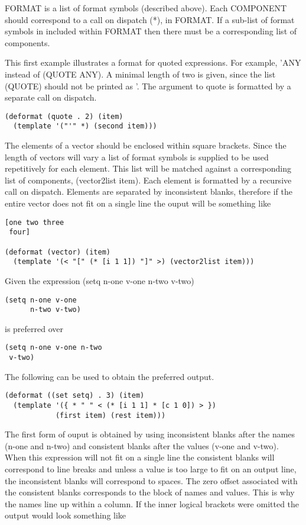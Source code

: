 {    FORMAT  is a list of format symbols (described above).  Each
    COMPONENT should correspond to a call on  dispatch  (*),  in
    FORMAT.   If a sub-list of format symbols in included within
    FORMAT  then  there  must  be  a   corresponding   list   of
    components.
}

  This   first   example   illustrates   a   format  for  quoted
expressions.  For example, 'ANY  instead  of  (QUOTE  ANY).    A
minimal  length  of  two is given, since the list (QUOTE) should
not be printed as '.  The argument to quote is  formatted  by  a
separate call on dispatch.

\begin{verbatim}
(deformat (quote . 2) (item)
  (template '("'" *) (second item)))
\end{verbatim}
  The  elements  of  a  vector  should be enclosed within square
brackets.  Since the length of  vectors  will  vary  a  list  of
format  symbols  is  supplied  to  be used repetitively for each
element.  This list will be matched against a corresponding list
of components, (vector2list item).  Each element is formatted by
a  recursive  call  on  dispatch.   Elements  are  separated  by
inconsistent blanks, therefore if the entire vector does not fit
on a single line the ouput will be something like
\begin{verbatim}
[one two three
 four]

(deformat (vector) (item)
  (template '(< "[" (* [i 1 1]) "]" >) (vector2list item)))
\end{verbatim}
Given the expression (setq n-one v-one n-two v-two)

\begin{verbatim}
(setq n-one v-one
      n-two v-two)
\end{verbatim}
is preferred over

\begin{verbatim}
(setq n-one v-one n-two
 v-two)
\end{verbatim}
  The following can be used to obtain the preferred output.

\begin{verbatim}
(deformat ((set setq) . 3) (item)
  (template '({ * " " < (* [i 1 1] * [c 1 0]) > })
            (first item) (rest item)))
\end{verbatim}
The first form of ouput is obtained by using inconsistent blanks
after  the  names  (n-one and n-two) and consistent blanks after
the values (v-one and v-two).  When this expression will not fit
on a single line the consistent blanks will correspond  to  line
breaks and unless a value is too large to fit on an output line,
the  inconsistent  blanks  will  correspond to spaces.  The zero
offset associated with the consistent blanks corresponds to  the
block of names and values.  This is why the names line up within
a column.  If the inner logical brackets were omitted the output
would look something like


